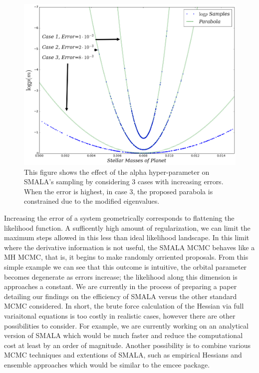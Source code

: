 \begin{figure}
\centering
\includegraphics[width=0.75\hsize]{alpha-1.png}
   \caption{This figure shows the effect of the alpha hyper-parameter on SMALA's sampling by considering 3 cases with increasing errors. When the error is highest, in case 3, the proposed parabola is constrained due to the modified eigenvalues.
}
      \label{alpha}
\end{figure}

Increasing the error of a system geometrically corresponds to flattening the likelihood function.
A sufficently high amount of regularization, we can limit the maximum steps allowed in this less than ideal likelihood landscape.
In this limit where the derivative information is not useful, the SMALA MCMC behaves like a MH MCMC, that is, it begins to make randomly orriented proposals.
From this simple example we can see that this outcome is intuitive, the orbital parameter becomes degenerate as errors increase; the likelihood along this dimension is approaches a constant.
We are currently in the process of preparing a paper detailing our findings on the efficiency of SMALA versus the other standard MCMC considered.
In short, the brute force calculation of the Hessian via full variaitonal equations is too costly in realistic cases, however there are other possibilities to consider.
For example, we are currently working on an analytical version of SMALA which would be much faster and reduce the computational cost at least by an order of magnitude.
Another possibility is to combine various MCMC techniques and extentions of SMALA, such as empirical Hessians \cite{papamarkou2016manifold} and ensemble approaches \cite{arampatzis2016langevin} which would be similar to the emcee package. 
